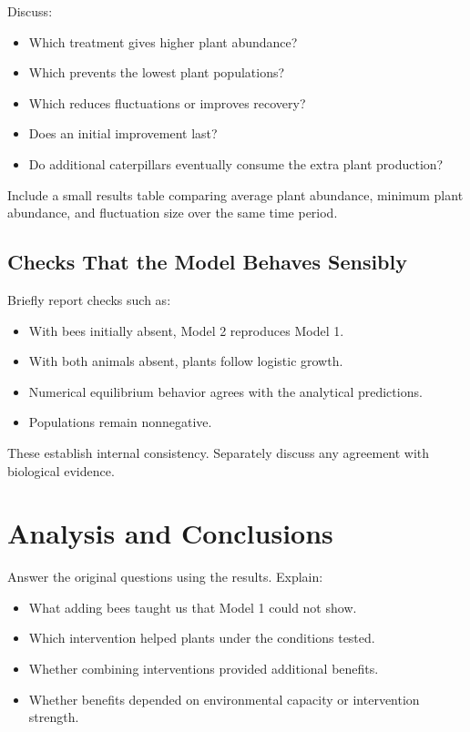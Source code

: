 \documentclass[11pt]{article}
\begin{document}
Discuss:
\begin{itemize}
    \item Which treatment gives higher plant abundance?
    \item Which prevents the lowest plant populations?
    \item Which reduces fluctuations or improves recovery?
    \item Does an initial improvement last?
    \item Do additional caterpillars eventually consume the extra plant
    production?
\end{itemize}

Include a small results table comparing average plant abundance, minimum
plant abundance, and fluctuation size over the same time period.

\subsection{Checks That the Model Behaves Sensibly}

Briefly report checks such as:
\begin{itemize}
    \item With bees initially absent, Model 2 reproduces Model 1.
    \item With both animals absent, plants follow logistic growth.
    \item Numerical equilibrium behavior agrees with the analytical
    predictions.
    \item Populations remain nonnegative.
\end{itemize}
These establish internal consistency. Separately discuss any agreement with
biological evidence.

\section{Analysis and Conclusions}

Answer the original questions using the results. Explain:
\begin{itemize}
    \item What adding bees taught us that Model 1 could not show.
    \item Which intervention helped plants under the conditions tested.
    \item Whether combining interventions provided additional benefits.
    \item Whether benefits depended on environmental capacity or
    intervention strength.
\end{itemize}
\end{document}
